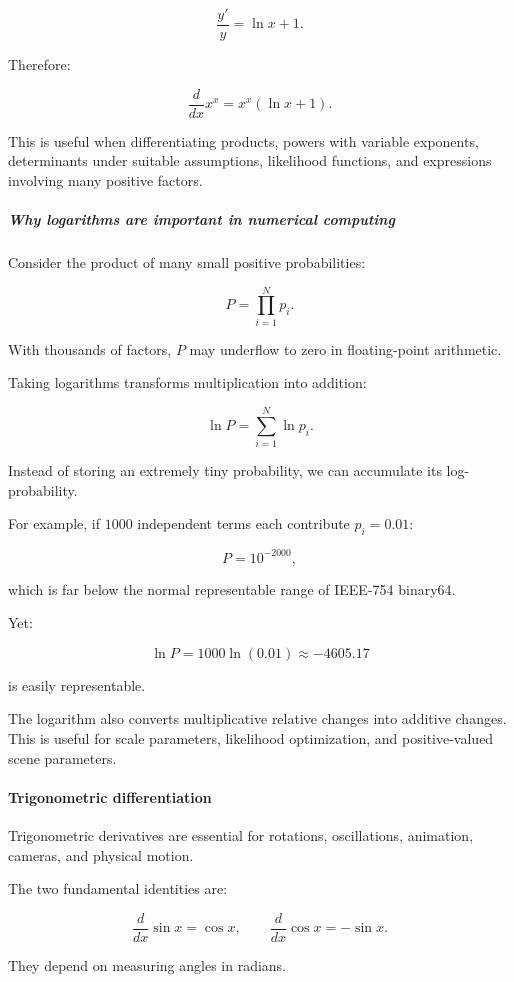 \[
\frac{y'}y=\ln x+1.
\]

Therefore:

\[
\boxed{\frac d{dx}x^x=x^x(\ln x+1)}.
\]

This is useful when differentiating products, powers with variable exponents, determinants under suitable assumptions, likelihood functions, and expressions involving many positive factors.

\subparagraph{Why logarithms are important in numerical computing}\label{01-foundations-i-ch020-why-logarithms-are-important-in-numerical-computing}

Consider the product of many small positive probabilities:

\[
P=\prod_{i=1}^{N}p_i.
\]

With thousands of factors, \(P\) may underflow to zero in floating-point arithmetic.

Taking logarithms transforms multiplication into addition:

\[
\ln P=\sum_{i=1}^{N}\ln p_i.
\]

Instead of storing an extremely tiny probability, we can accumulate its log-probability.

For example, if \(1000\) independent terms each contribute \(p_i=0.01\):

\[
P=10^{-2000},
\]

which is far below the normal representable range of IEEE-754 binary64.

Yet:

\[
\ln P=1000\ln(0.01)\approx-4605.17
\]

is easily representable.

The logarithm also converts multiplicative relative changes into additive changes. This is useful for scale parameters, likelihood optimization, and positive-valued scene parameters.

\paragraph{Trigonometric differentiation}\label{01-foundations-i-ch020-trigonometric-differentiation}

Trigonometric derivatives are essential for rotations, oscillations, animation, cameras, and physical motion.

The two fundamental identities are:

\[
\boxed{\frac d{dx}\sin x=\cos x}, \qquad \boxed{\frac d{dx}\cos x=-\sin x}.
\]

They depend on measuring angles in radians.

